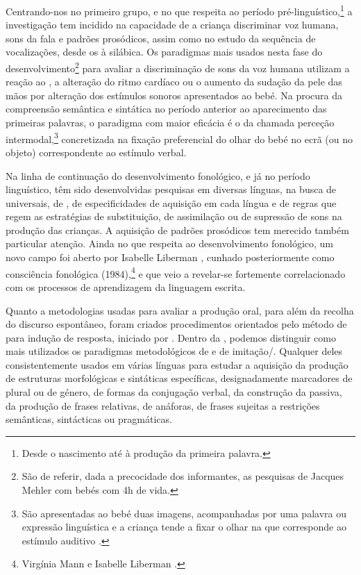 \documentclass[output=paper]{LSP/langsci}
\begin{document}
Centrando-nos no primeiro grupo, e no que respeita ao período pré-lin\-gu\-ís\-ti\-co,\footnote{Desde o nascimento até à produção da primeira palavra.} a investigação tem incidido na capacidade de a criança discriminar voz humana, sons da fala e padrões prosódicos, assim como no estudo da sequência de vocalizações, desde os  à  silábica. Os paradigmas mais usados nesta fase do desenvolvimento\footnote{São de referir, dada a precocidade dos informantes, as pesquisas de Jacques Mehler \citeyearpar{mehler_etal1988} com bebés com 4h de vida.} para avaliar a discriminação de sons da voz humana utilizam a reação ao , a alteração do ritmo cardíaco ou o aumento da sudação da pele das mãos por alteração dos estímulos sonoros apresentados ao bebé. Na procura da compreensão semântica e sintática no período anterior ao aparecimento das primeiras palavras, o paradigma com maior eficácia é o da chamada perceção intermodal,\footnote{São apresentadas ao bebé duas imagens, acompanhadas por uma palavra ou expressão linguística e a criança tende a fixar o olhar na que corresponde ao estímulo auditivo \citep[cf.][]{mcdaniel_etal1998}.} concretizada na fixação preferencial do olhar do bebé no ecrã (ou no objeto) correspondente ao estímulo verbal.

Na linha de continuação do desenvolvimento fonológico, e já no período linguístico, têm sido desenvolvidas pesquisas em diversas línguas, na busca de universais, de , de especificidades de aquisição em cada língua e de regras que regem as estratégias de substituição, de assimilação ou de supressão de sons na produção das crianças. A aquisição de padrões prosódicos tem merecido também particular atenção. Ainda no que respeita ao desenvolvimento fonológico, um novo campo foi aberto por Isabelle Liberman \citeyearpar{liberman1973}, cunhado posteriormente como consciência fonológica (1984),\footnote{Virgínia Mann e Isabelle Liberman \citeyearpar{mannliberman1984}.} e que veio a revelar-se fortemente correlacionado com os processos de aprendizagem da linguagem escrita.

Quanto a metodologias usadas para avaliar a produção oral, para além da recolha do discurso espontâneo, foram criados procedimentos orientados pelo método de  para indução de resposta, iniciado por \citet{berko1958}. Dentro da , podemos distinguir como mais utilizados os paradigmas metodológicos de  e de imitação/. Qualquer deles consistentemente usados em várias línguas para estudar a aquisição da produção de estruturas morfológicas e sintáticas específicas, designadamente marcadores de plural ou de género, de formas da conjugação verbal, da construção da passiva, da produção de frases relativas, de anáforas, de frases sujeitas a restrições semânticas, sintácticas ou pragmáticas.
\end{document}
